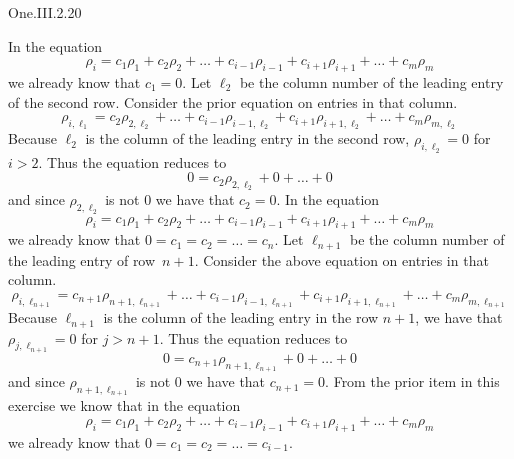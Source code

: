 \begin{ans}{One.III.2.20}
      \begin{exparts}
        \partsitem
          In the equation
          \begin{equation*}
            \rho_i=c_1\rho_1+c_2\rho_2+\ldots+c_{i-1}\rho_{i-1}+
                     c_{i+1}\rho_{i+1}+\ldots+c_m\rho_m
          \end{equation*}
          we already know that $c_1=0$.
          Let $\ell_2$ be the column number of the leading entry of the
          second row.
          Consider the prior equation on entries in that column.
          \begin{equation*}
             \rho_{i,\ell_1}=c_2\rho_{2,\ell_2}+\ldots+c_{i-1}\rho_{i-1,\ell_2}
                             +c_{i+1}\rho_{i+1,\ell_2}+\ldots+c_m\rho_{m,\ell_2}
          \end{equation*}
          Because $\ell_2$ is the column of the leading entry in the second
          row, $\rho_{i,\ell_2}=0$ for $i>2$.
          Thus the equation reduces to
          \begin{equation*}
             0=c_2\rho_{2,\ell_2}+0+\ldots+0
          \end{equation*}
          and since $\rho_{2,\ell_2}$ is not $0$ we have that $c_2=0$.
        \partsitem
          In the equation
          \begin{equation*}
            \rho_i=c_1\rho_1+c_2\rho_2+\ldots+c_{i-1}\rho_{i-1}+
                     c_{i+1}\rho_{i+1}+\ldots+c_m\rho_m
          \end{equation*}
          we already know that $0=c_1=c_2=\dots =c_n$.
          Let $\ell_{n+1}$ be the column number of the leading entry of
          row~$n+1$.
          Consider the above equation on entries in that column.
          \begin{equation*}
             \rho_{i,\ell_{n+1}}=c_{n+1}\rho_{n+1,\ell_{n+1}}+\ldots
                             +c_{i-1}\rho_{i-1,\ell_{n+1}}
                             +c_{i+1}\rho_{i+1,\ell_{n+1}}
                             +\dots+c_m\rho_{m,\ell_{n+1}}
          \end{equation*}
          Because $\ell_{n+1}$ is the column of the leading entry in the
          row $n+1$, we have that $\rho_{j,\ell_{n+1}}=0$ for $j>{n+1}$.
          Thus the equation reduces to
          \begin{equation*}
             0=c_{n+1}\rho_{n+1,\ell_{n+1}}+0+\ldots+0
          \end{equation*}
          and since $\rho_{n+1,\ell_{n+1}}$ is not $0$ we have that $c_{n+1}=0$.
        \partsitem
          From the prior item in this exercise we know that in the equation
          \begin{equation*}
            \rho_i=c_1\rho_1+c_2\rho_2+\ldots+c_{i-1}\rho_{i-1}+
                     c_{i+1}\rho_{i+1}+\ldots+c_m\rho_m
          \end{equation*}
          we already know that $0=c_1=c_2=\dots =c_{i-1}$.


\end{exparts}
\end{ans}
